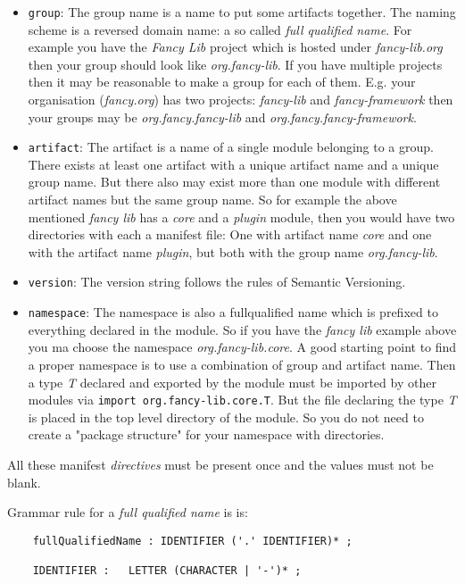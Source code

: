 \documentclass[a4paper,12pt]{article}
\begin{document}
\begin{itemize}
    \item \verb|group|: The group name is a name to put some artifacts together. The naming scheme is a reversed domain name: a so called \textit{full qualified name}. For example you have the \textit{Fancy Lib} project which is hosted under \textit{fancy-lib.org} then your group should look like \textit{org.fancy-lib}. If you have multiple projects then it may be reasonable to make a group for each of them. E.g. your organisation (\textit{fancy.org}) has two projects: \textit{fancy-lib} and \textit{fancy-framework} then your groups may be \textit{org.fancy.fancy-lib} and \textit{org.fancy.fancy-framework}.
    \item \verb|artifact|: The artifact is a name of a single module belonging to a group. There exists at least one artifact with a unique artifact name and a unique group name. But there also may exist more than one module with different artifact names but the same group name. So for example the above mentioned \textit{fancy lib} has a \textit{core} and a \textit{plugin} module, then you would have two directories with each a manifest file: One with artifact name \textit{core} and one with the artifact name \textit{plugin}, but both with the group name \textit{org.fancy-lib}.
    \item \verb|version|: The version string follows the rules of Semantic Versioning\cite{semver}.
    \item \verb|namespace|: The namespace is also a fullqualified name which is prefixed to everything declared in the module. So if you have the \textit{fancy lib} example above you ma choose the namespace \textit{org.fancy-lib.core}. A good starting point to find a proper namespace is to use a combination of group and artifact name. Then a type \textit{T} declared and exported by the module must be imported by other modules via \verb|import org.fancy-lib.core.T|. But the file declaring the type \textit{T} is placed in the top level directory of the module. So you do not need to create a "package structure" for your namespace with directories. 
\end{itemize}

All these manifest \textit{directives} must be present once and the values must not be blank.

Grammar rule for a \textit{full qualified name} is is: 
\begin{verbatim}
    fullQualifiedName : IDENTIFIER ('.' IDENTIFIER)* ;
    
    IDENTIFIER :   LETTER (CHARACTER | '-')* ;
\end{verbatim}
\end{document}
